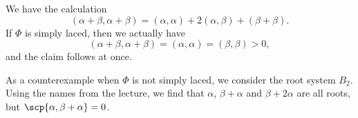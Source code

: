 We have the calculation
\[ (\alpha + \beta, \alpha + \beta) = (\alpha, \alpha) + 2(\alpha, \beta) + (\beta + \beta). \]
If $\Phi$ is simply laced, then we actually have
\[ (\alpha + \beta, \alpha + \beta) = (\alpha, \alpha) = (\beta, \beta) > 0, \]
and the claim follows at once.

As a counterexample when $\Phi$ is not simply laced, we consider the root
system $B_2$. Using the names from the lecture, we find that
$\alpha$, $\beta + \alpha$ and $\beta + 2\alpha$ are all roots, but
$\scp{\alpha, \beta + \alpha} = 0$.
